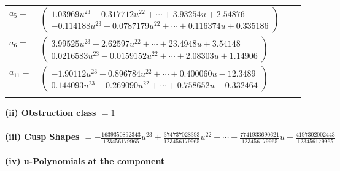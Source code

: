 \documentclass[1p]{elsarticle_modified}
\theoremstyle{definition}
\begin{document}
\begin{tabular}{m{7pt} m{180pt} m{7pt} m{180pt} }
\flushright $a_{5}=$&$\begin{pmatrix}1.03969 u^{23}-0.317712 u^{22}+\cdots+3.93254 u+2.54876\\-0.114188 u^{23}+0.0787179 u^{22}+\cdots+0.116374 u+0.335186\end{pmatrix}$ \\
\flushright $a_{6}=$&$\begin{pmatrix}3.99525 u^{23}-2.62597 u^{22}+\cdots+23.4948 u+3.54148\\0.0216583 u^{23}-0.0159152 u^{22}+\cdots+2.08303 u+1.14906\end{pmatrix}$ \\
\flushright $a_{11}=$&$\begin{pmatrix}-1.90112 u^{23}-0.896784 u^{22}+\cdots+0.400060 u-12.3489\\0.144093 u^{23}-0.269090 u^{22}+\cdots+0.758652 u-0.332464\end{pmatrix}$\\&\end{tabular}
\flushleft \textbf{(ii) Obstruction class $= 1$}\\~\\
\flushleft \textbf{(iii) Cusp Shapes $= -\frac{1639350892343}{123456179965} u^{23}+\frac{374737028393}{123456179965} u^{22}+\cdots-\frac{7741933690621}{123456179965} u-\frac{4197302002443}{123456179965}$}\\~\\
\newpage\renewcommand{\arraystretch}{1}
\flushleft \textbf{(iv) u-Polynomials at the component}\newline \\
\end{document}
